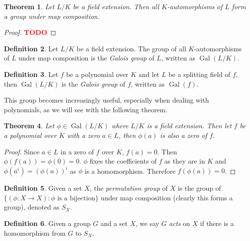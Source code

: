 \documentclass[12pt]{article}
\newtheorem{theorem}{Theorem}
\theoremstyle{definition}
\newtheorem{definition}[theorem]{Definition}
\newcommand{\Gal}{\operatorname{Gal}}
\newcommand{\TODO}{\textbf{\textcolor{red}{TODO}}}
\begin{document}
\begin{theorem}
	Let $L/K$ be a field extension. Then all $K$-automorphisms of $L$ form a group under map composition.
\end{theorem}

\begin{proof}
	\TODO
\end{proof}
\begin{definition}
    Let $L/K$ be a field extension. The group of all $K$-automorphisms of $L$ under map composition is the \textit{Galois group} of $L$, written as \(\Gal(L/K)\).
\end{definition}

\begin{definition}
	Let $f$ be a polynomial over $K$ and let $L$ be a splitting field of $f$, then $\Gal(L/K)$ is the \textit{Galois group} of $f$, written as \(\Gal(f)\).
	
\end{definition}

This group becomes increasingly useful, especially when dealing with polynomials, as we will see with the following theorem.

\begin{theorem} \label{thm:galois-group-permutes-zeros}
Let $\phi \in \Gal(L/K)$ where $L/K$ is a field extension. Then let $f$ be a polynomial over $K$ with a zero $a \in L$, then $\phi(a)$ is also a zero of $f$.
\end{theorem}

\begin{proof}
    Since $a \in L$ in a zero of $f$ over $K$, $f(a) = 0$. Then $\phi(f(a)) = \phi(0) = 0$. $\phi$ fixes the coefficients of $f$ as they are in $K$ and $\phi\left(a^i\right) = \left(\phi(a) \right) ^i$ as $\phi$ is a homomorphism. Therefore $f(\phi(a)) = 0$. 
\end{proof}

\begin{definition}
	Given a set $X$, the \textit{permutation group} of $X$ is the group of $\{ (\phi : X \to X) : \phi \text{ is a bijection} \}$ under map composition (clearly this forms a group), denoted as $S_X$. 
\end{definition}

\begin{definition}
	Given a group $G$ and a set $X$, we say $G$ \textit{acts} on $X$ if there is a homomorphism from $G$ to $S_X$.
\end{definition}
\end{document}

